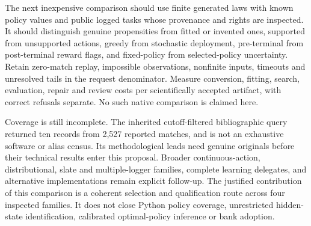 The next inexpensive comparison should use finite generated laws with known
policy values and public logged tasks whose provenance and rights are inspected.
It should distinguish genuine propensities from fitted or invented ones, supported
from unsupported actions, greedy from stochastic deployment, pre-terminal from
post-terminal reward flags, and fixed-policy from selected-policy uncertainty.
Retain zero-match replay, impossible observations, nonfinite inputs, timeouts
and unresolved tails in the request denominator. Measure conversion, fitting,
search, evaluation, repair and review costs per scientifically accepted artifact,
with correct refusals separate. No such native comparison is claimed here.

Coverage is still incomplete. The inherited cutoff-filtered bibliographic query
returned ten records from 2,527 reported matches, and is not an exhaustive software
or alias census. Its methodological leads need genuine originals before their
technical results enter this proposal. Broader continuous-action, distributional,
slate and multiple-logger families, complete learning delegates, and alternative
implementations remain explicit follow-up. The justified contribution of this
comparison is a coherent selection and qualification route across four inspected
families. It does not close Python policy coverage, unrestricted hidden-state
identification, calibrated optimal-policy inference or bank adoption.
\citep{exec24_policiespython_comparison}
